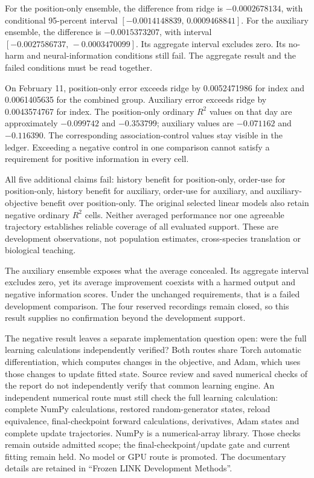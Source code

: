 For the position-only ensemble, the difference from ridge is
$-0.0002678134$, with conditional 95-percent interval
$[-0.0014148839,\,0.0009468841]$. For the auxiliary ensemble, the difference is
$-0.0015373207$, with interval $[-0.0027586737,\,-0.0003470099]$. Its aggregate
interval excludes zero. Its no-harm and neural-information conditions still
fail. The aggregate result and the failed conditions must be read together.

On February 11, position-only error exceeds ridge by 0.0052471986 for index and
0.0061405635 for the combined group. Auxiliary error exceeds ridge by
0.0043574767 for index. The position-only ordinary $R^2$ values on that day
are approximately $-0.099742$ and $-0.353799$; auxiliary values are
$-0.071162$ and $-0.116390$. The corresponding association-control values
stay visible in the ledger. Exceeding a negative control in one comparison
cannot satisfy a requirement for positive information in every cell.

All five additional claims fail: history benefit for position-only, order-use
for position-only, history benefit for auxiliary, order-use for auxiliary,
and auxiliary-objective benefit over position-only. The original selected
linear models also retain negative ordinary $R^2$ cells. Neither averaged
performance nor one agreeable trajectory establishes reliable coverage of all
evaluated support. These are development observations, not population estimates,
cross-species translation or biological teaching.

The auxiliary ensemble exposes what the average concealed. Its aggregate interval excludes zero, yet its average improvement coexists with a harmed output and negative information scores. Under the unchanged requirements, that is a failed development comparison. The four reserved recordings remain closed, so this result supplies no confirmation beyond the development support.

The negative result leaves a separate implementation question open: were the full learning calculations independently verified? Both routes share Torch automatic differentiation, which computes changes in the objective, and Adam, which uses those changes to update fitted state. Source review and saved numerical checks of the report do not independently verify that common learning engine. An independent numerical route must still check the full learning calculation: complete NumPy calculations, restored random-generator states, reload equivalence, final-checkpoint forward calculations, derivatives, Adam states and complete update trajectories. NumPy is a numerical-array library. Those checks remain outside admitted scope; the final-checkpoint/update gate and current fitting remain held. No model or GPU route is promoted. The documentary details are retained in ``Frozen LINK Development Methods''.

